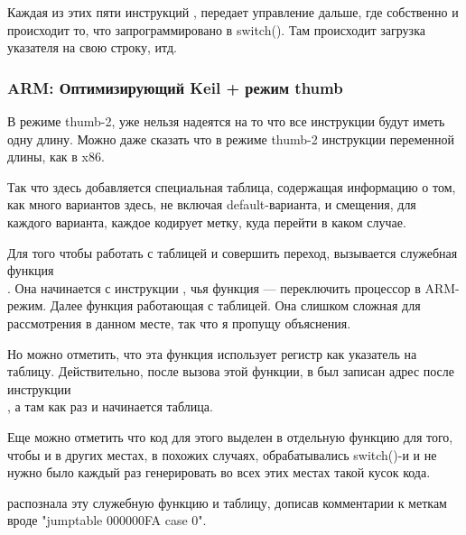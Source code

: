 Каждая из этих пяти инструкций , передает управление дальше, где собственно и происходит то, 
что запрограммировано в switch(). Там происходит загрузка указателя на свою строку, итд.

\subsubsection{ARM: Оптимизирующий Keil + режим thumb}



В режиме thumb-2, уже нельзя надеятся на то что все инструкции будут иметь одну длину. 
Можно даже сказать что в режиме thumb-2 инструкции переменной длины, как в x86.

Так что здесь добавляется специальная таблица, содержащая информацию о том, как много вариантов здесь,
не включая default-варианта, и смещения, для каждого варианта, каждое кодирует метку, куда перейти в 
каком случае.

Для того чтобы работать с таблицей и совершить переход, вызывается служебная функция \\
. Она начинается с инструкции , чья функция --- 
переключить процессор в ARM-режим. Далее функция работающая с таблицей. Она слишком сложная для 
рассмотрения в данном месте, так что я пропущу объяснения.

Но можно отметить, что эта функция использует
регистр \LR как указатель на таблицу. Действительно, после вызова этой функции, в \LR был записан
адрес после инструкции \\ 
, а там как раз и начинается таблица.

Еще можно отметить что код для этого выделен в отдельную функцию для того, чтобы и в других местах,
в похожих случаях, обрабатывались switch()-и и не нужно было каждый раз генерировать во всех этих
местах такой кусок кода.

\IDA распознала эту служебную функцию и таблицу, дописав комментарии к меткам вроде "jumptable 000000FA case 0".
